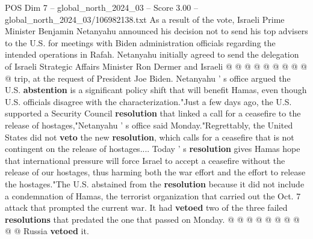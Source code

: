 \begin{textsample}{POS Dim 7 – global\_north\_2024\_03 – Score 3.00 – global\_north\_2024\_03/106982138.txt}
As a result of the vote, Israeli Prime Minister Benjamin Netanyahu announced his decision not to send his top advisers to the U.S. for meetings with Biden administration officials regarding the intended operations in Rafah.
Netanyahu initially agreed to send the delegation of Israeli Strategic Affairs Minister Ron Dermer and Israeli @ @ @ @ @ @ @ @ @ @ trip, at the request of President Joe Biden.
Netanyahu ' s office argued the U.S. \textbf{abstention} is a significant policy shift that will benefit Hamas, even though U.S. officials disagree with the characterization."Just a few days ago, the U.S. supported a Security Council \textbf{resolution} that linked a call for a ceasefire to the release of hostages,"Netanyahu ' s office said Monday."Regrettably, the United States did not \textbf{veto} the new \textbf{resolution}, which calls for a ceasefire that is not contingent on the release of hostages....
Today ' s \textbf{resolution} gives Hamas hope that international pressure will force Israel to accept a ceasefire without the release of our hostages, thus harming both the war effort and the effort to release the hostages."The U.S. abstained from the \textbf{resolution} because it did not include a condemnation of Hamas, the terrorist organization that carried out the Oct. 7 attack that prompted the current war.
It had \textbf{vetoed} two of the three failed \textbf{resolutions} that predated the one that passed on Monday. @ @ @ @ @ @ @ @ @ @ Russia \textbf{vetoed} it.

\end{textsample}
